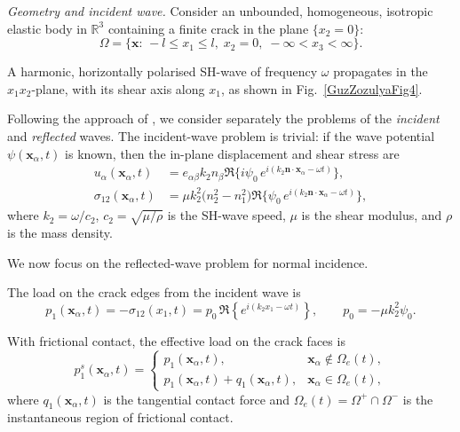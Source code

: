 \medskip
\emph{Geometry and incident wave.} Consider an unbounded, homogeneous, isotropic elastic body in
$\mathbb{R}^{3}$ containing a finite crack in the plane $\{x_{2}=0\}$:
\begin{equation}\label{GuzZozulyaEq63}
	\Omega
	=
	\bigl\{
	\mathbf{x}:\,
	-l \le x_1 \le l,\;
	x_2 = 0,\;
	-\infty < x_3 < \infty
	\bigr\}.
\end{equation}

A harmonic, horizontally polarised SH-wave of frequency $\omega$
propagates in the $x_1x_2$-plane, with its shear axis along $x_1$, as shown in
Fig.~\ref{GuzZozulyaFig4}.  

Following the approach of
\cite{GuzZozulyaRef1,GuzZozulyaRef15,GuzZozulyaRef18},
we consider separately the problems of the \emph{incident} and \emph{reflected} waves.
The incident-wave problem is trivial:
if the wave potential $\psi(\mathbf{x}_\alpha,t)$ is known, then the in-plane
displacement and shear stress are
\begin{equation}\label{GuzZozulyaEq65}
	\begin{array}{ll}
		u_\alpha(\mathbf{x}_\alpha,t)
	&= e_{\alpha\beta} k_2 n_\beta
	\Re\bigl\{
	i\psi_0\,e^{i(k_2 \mathbf{n}\cdot \mathbf{x}_\alpha - \omega t)}
	\bigr\},
	\\[4pt]
	\sigma_{12}(\mathbf{x}_\alpha,t)
	&= \mu k_2^2 \bigl(n_2^2-n_1^2\bigr)
	\Re\bigl\{
	\psi_0\,e^{i(k_2 \mathbf{n}\cdot \mathbf{x}_\alpha - \omega t)}
	\bigr\},
	\end{array}
\end{equation}
where $k_2=\omega/c_2$, $c_2=\sqrt{\mu/\rho}$ is the SH-wave speed,
$\mu$ is the shear modulus, and $\rho$ is the mass density.

We now focus on the reflected-wave problem for normal incidence.

The load on the crack edges from the incident wave is
\begin{equation}\label{GuzZozulyaEq66}
	p_1(\mathbf{x}_\alpha,t)
	= -\sigma_{12}(x_1,t)
	= p_0\,\Re\left\{ e^{i(k_2 x_1 - \omega t)} \right\},
	\qquad
	p_0=-\mu k_2^2 \psi_0.
\end{equation}

With frictional contact, the effective load on the crack faces is
\begin{equation}\label{GuzZozulyaEq67}
	p_1^{s}(\mathbf{x}_\alpha,t)
	=
	\begin{cases}
		p_1(\mathbf{x}_\alpha,t), & \mathbf{x}_\alpha \notin \Omega_e(t),
		\\
		p_1(\mathbf{x}_\alpha,t)+q_1(\mathbf{x}_\alpha,t), & \mathbf{x}_\alpha \in \Omega_e(t),
	\end{cases}
\end{equation}
where $q_1(\mathbf{x}_\alpha,t)$ is the tangential contact force and
$\Omega_e(t) = \Omega^+\cap\Omega^-$ is the instantaneous region of frictional
contact.

